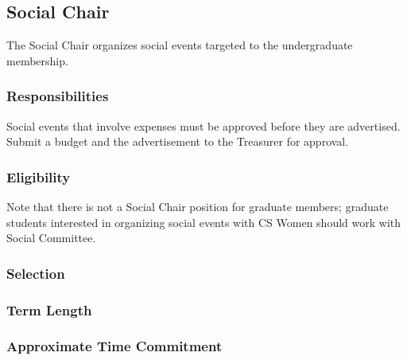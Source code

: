 \subsection{Social Chair}
\label{sec:social}
The Social Chair organizes social events targeted to the undergraduate membership. 

\subsubsection{Responsibilities}

Social events that involve expenses must be approved before they are advertised. Submit a budget and the advertisement to the Treasurer for approval. 

\subsubsection{Eligibility}

Note that there is not a Social Chair position for graduate members; graduate students interested in organizing social events with CS Women should work with Social Committee.

\subsubsection{Selection}

\subsubsection{Term Length}

\subsubsection{Approximate Time Commitment}
